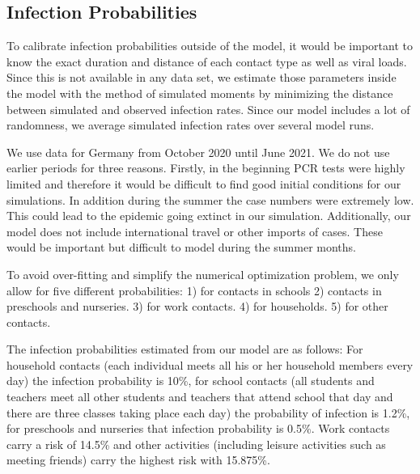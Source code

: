 \FloatBarrier


\subsection{Infection Probabilities}
\label{subsec:infection_probs}


To calibrate infection probabilities outside of the model, it would be important to know
the exact duration and distance of each contact type as well as viral loads. Since this
is not available in any data set, we estimate those parameters inside the model with the
method of simulated moments \citep{McFadden1989} by minimizing the distance between
simulated and observed infection rates. Since our model includes a lot of randomness, we
average simulated infection rates over several model runs.

We use data for Germany from October 2020 until June 2021. We do not use
earlier periods for three reasons. Firstly, in the beginning PCR tests were highly
limited and therefore it would be difficult to find good initial conditions for our
simulations. In addition during the summer the case numbers were extremely low. This
could lead to the epidemic going extinct in our simulation. Additionally, our model does
not include international travel or other imports of cases. These would be important but
difficult to model during the summer months.

To avoid over-fitting and simplify the numerical optimization problem, we only allow for
five different probabilities: 1) for contacts in schools 2) contacts in preschools and
nurseries. 3) for work contacts. 4) for households. 5) for other contacts.

The infection probabilities estimated from our model are as follows: For household
contacts (each individual meets all his or her household members every day) the infection
probability is 10\%, for school contacts (all students and teachers meet all other
students and teachers that attend school that day and there are three classes taking
place each day) the probability of infection is 1.2\%, for preschools and nurseries that
infection probability is 0.5\%. Work contacts carry a risk of 14.5\% and other activities
(including leisure activities such as meeting friends) carry the highest risk with
15.875\%.

